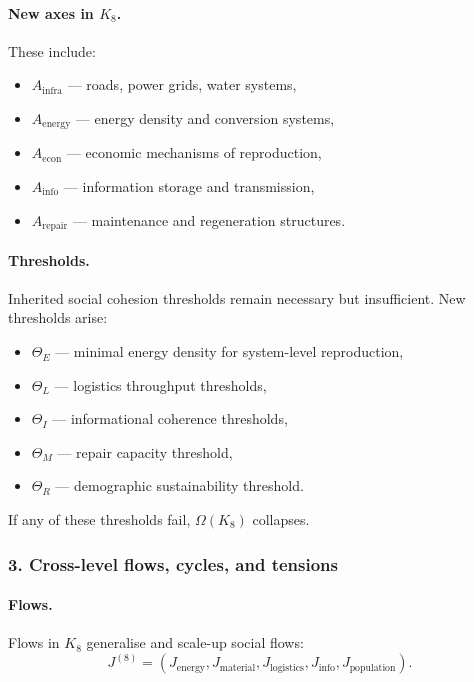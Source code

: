\paragraph{New axes in \texorpdfstring{$K_8$}{K_8}.}
These include:
\begin{itemize}
  \item $A_{\mathrm{infra}}$ — roads, power grids, water systems,
  \item $A_{\mathrm{energy}}$ — energy density and conversion systems,
  \item $A_{\mathrm{econ}}$ — economic mechanisms of reproduction,
  \item $A_{\mathrm{info}}$ — information storage and transmission,
  \item $A_{\mathrm{repair}}$ — maintenance and regeneration structures.
\end{itemize}

\paragraph{Thresholds.}
Inherited social cohesion thresholds remain necessary but insufficient.
New thresholds arise:
\begin{itemize}
  \item $\Theta_E$ — minimal energy density for system-level reproduction,
  \item $\Theta_L$ — logistics throughput thresholds,
  \item $\Theta_I$ — informational coherence thresholds,
  \item $\Theta_M$ — repair capacity threshold,
  \item $\Theta_R$ — demographic sustainability threshold.
\end{itemize}

If any of these thresholds fail, $\Omega(K_8)$ collapses.

\subsubsection{3. Cross-level flows, cycles, and tensions}

\paragraph{Flows.}
Flows in $K_8$ generalise and scale-up social flows:
\[
J^{(8)} = (J_{\mathrm{energy}}, J_{\mathrm{material}},
          J_{\mathrm{logistics}}, J_{\mathrm{info}},
          J_{\mathrm{population}}).
\]

